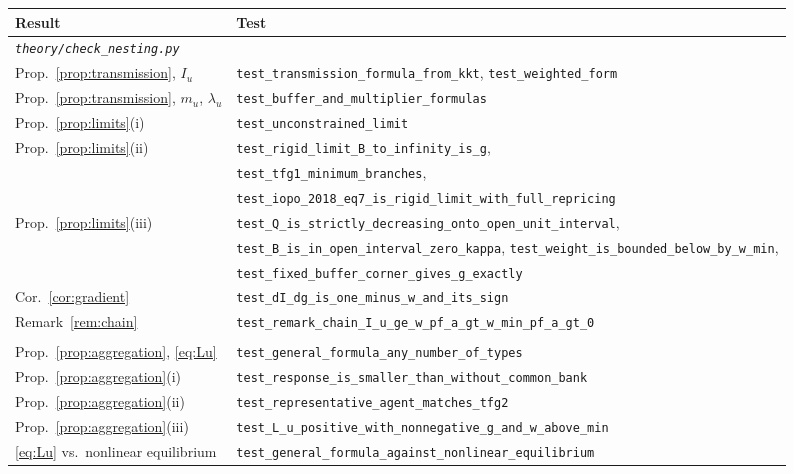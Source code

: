 \documentclass[11pt]{article}
\theoremstyle{remark}
\begin{document}
\begin{center}\footnotesize\setlength{\tabcolsep}{3pt}
\begin{tabular}{ll}
\toprule
Result & Test \\
\midrule
\multicolumn{2}{l}{\emph{\texttt{theory/check\_nesting.py}}} \\
Prop.~\ref{prop:transmission}, $I_u$ & \texttt{test\_transmission\_formula\_from\_kkt}, \texttt{test\_weighted\_form} \\
Prop.~\ref{prop:transmission}, $m_u$, $\lambda_u$ & \texttt{test\_buffer\_and\_multiplier\_formulas} \\
Prop.~\ref{prop:limits}(i) & \texttt{test\_unconstrained\_limit} \\
Prop.~\ref{prop:limits}(ii) & \texttt{test\_rigid\_limit\_B\_to\_infinity\_is\_g}, \\
 & \texttt{test\_tfg1\_minimum\_branches}, \\
 & \texttt{test\_iopo\_2018\_eq7\_is\_rigid\_limit\_with\_full\_repricing} \\
Prop.~\ref{prop:limits}(iii) & \texttt{test\_Q\_is\_strictly\_decreasing\_onto\_open\_unit\_interval}, \\
 & \texttt{test\_B\_is\_in\_open\_interval\_zero\_kappa}, \texttt{test\_weight\_is\_bounded\_below\_by\_w\_min}, \\
 & \texttt{test\_fixed\_buffer\_corner\_gives\_g\_exactly} \\
Cor.~\ref{cor:gradient} & \texttt{test\_dI\_dg\_is\_one\_minus\_w\_and\_its\_sign} \\
Remark~\ref{rem:chain} & \texttt{test\_remark\_chain\_I\_u\_ge\_w\_pf\_a\_gt\_w\_min\_pf\_a\_gt\_0} \\
\addlinespace
\multicolumn{2}{l}{\emph{\texttt{theory/check\_aggregation.py}}} \\
Prop.~\ref{prop:aggregation}, \eqref{eq:Lu} & \texttt{test\_general\_formula\_any\_number\_of\_types} \\
Prop.~\ref{prop:aggregation}(i) & \texttt{test\_response\_is\_smaller\_than\_without\_common\_bank} \\
Prop.~\ref{prop:aggregation}(ii) & \texttt{test\_representative\_agent\_matches\_tfg2} \\
Prop.~\ref{prop:aggregation}(iii) & \texttt{test\_L\_u\_positive\_with\_nonnegative\_g\_and\_w\_above\_min} \\
\eqref{eq:Lu} vs.\ nonlinear equilibrium & \texttt{test\_general\_formula\_against\_nonlinear\_equilibrium} \\
\bottomrule
\end{tabular}
\end{center}
\end{document}
